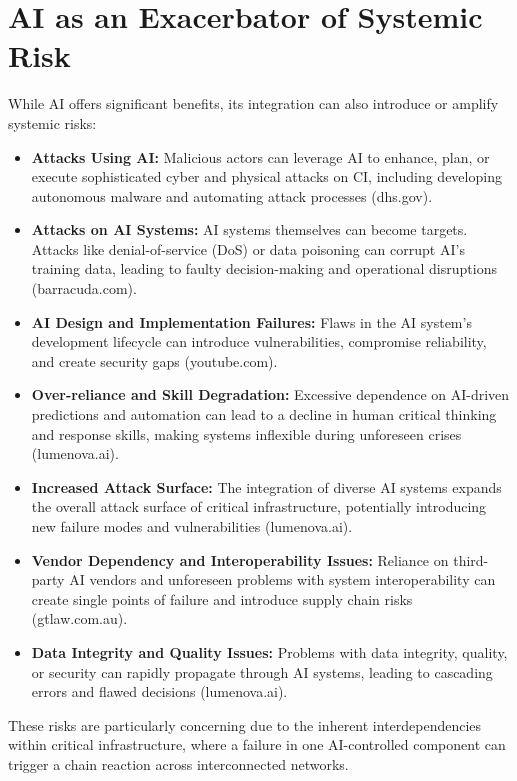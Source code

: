\section{AI as an Exacerbator of Systemic Risk}
While AI offers significant benefits, its integration can also introduce or amplify systemic risks:
\begin{itemize}
    \item \textbf{Attacks Using AI:} Malicious actors can leverage AI to enhance, plan, or execute sophisticated cyber and physical attacks on CI, including developing autonomous malware and automating attack processes (dhs.gov).
    \item \textbf{Attacks on AI Systems:} AI systems themselves can become targets. Attacks like denial-of-service (DoS) or data poisoning can corrupt AI's training data, leading to faulty decision-making and operational disruptions (barracuda.com).
    \item \textbf{AI Design and Implementation Failures:} Flaws in the AI system's development lifecycle can introduce vulnerabilities, compromise reliability, and create security gaps (youtube.com).
    \item \textbf{Over-reliance and Skill Degradation:} Excessive dependence on AI-driven predictions and automation can lead to a decline in human critical thinking and response skills, making systems inflexible during unforeseen crises (lumenova.ai).
    \item \textbf{Increased Attack Surface:} The integration of diverse AI systems expands the overall attack surface of critical infrastructure, potentially introducing new failure modes and vulnerabilities (lumenova.ai).
    \item \textbf{Vendor Dependency and Interoperability Issues:} Reliance on third-party AI vendors and unforeseen problems with system interoperability can create single points of failure and introduce supply chain risks (gtlaw.com.au).
    \item \textbf{Data Integrity and Quality Issues:} Problems with data integrity, quality, or security can rapidly propagate through AI systems, leading to cascading errors and flawed decisions (lumenova.ai).
\end{itemize}
These risks are particularly concerning due to the inherent interdependencies within critical infrastructure, where a failure in one AI-controlled component can trigger a chain reaction across interconnected networks.

